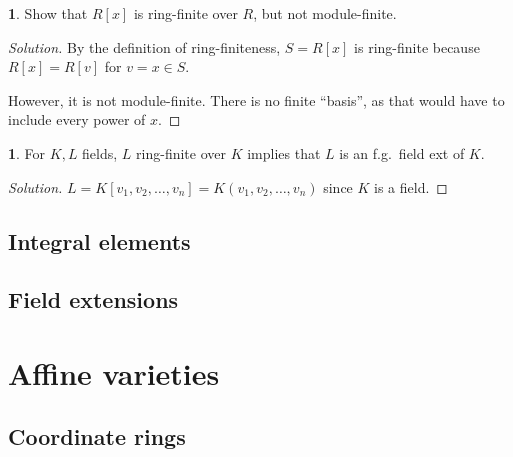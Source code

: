 \documentclass{book}
\theoremstyle{definition}
\theoremstyle{block}
\newtheorem{block*}[block]{}
\theoremstyle{thm}
\begin{document}
\begin{block*}
  Show that $R[x]$ is ring-finite over $R$, but not module-finite.
\end{block*}
\begin{proof}[Solution]
  By the definition of ring-finiteness, $S = R[x]$ is ring-finite because $R[x]
  = R[v]$ for $v = x \in S$.\par
  However, it is not module-finite. There is no finite ``basis'', as that would
  have to include every power of $x$.
\end{proof}

\begin{block*}
  For $K,L$ fields, $L$ ring-finite over $K$ implies that $L$ is an f.g.\ field
  ext of $K$.
\end{block*}
\begin{proof}[Solution]
  $L=K[v_1,v_2,\ldots,v_n]=K(v_1,v_2,\ldots,v_n)$ since $K$ is a field.
\end{proof}

\section{Integral elements}

\section{Field extensions}

\chapter{Affine varieties}

\section{Coordinate rings}
\end{document}
